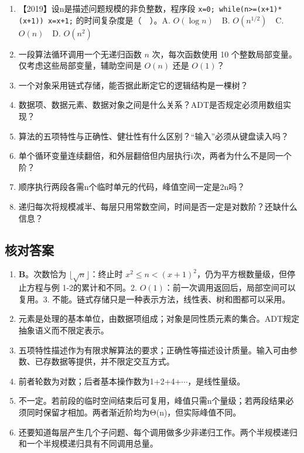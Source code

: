 \begin{recallcard}

\begin{enumerate}
\def\labelenumi{\arabic{enumi}.}
\tightlist
\item
  【2019】设n是描述问题规模的非负整数，程序段 \texttt{x=\allowbreak{}0;\allowbreak{} while(\allowbreak{}n>\allowbreak{}=\allowbreak{}(\allowbreak{}x+\allowbreak{}1)\allowbreak{}*\allowbreak{}(\allowbreak{}x+\allowbreak{}1)\allowbreak{})\allowbreak{} x=\allowbreak{}x+\allowbreak{}1;\allowbreak{}} 的时间复杂度是（　）。A. \(O(\log n)\)　B. \(O(n^{1/2})\)　C. \(O(n)\)　D. \(O(n^2)\)
\item
  一段算法循环调用一个无递归函数 \(n\) 次，每次函数使用 10 个整数局部变量。仅考虑这些局部变量，辅助空间是 \(O(n)\) 还是 \(O(1)\)？
\item
  一个对象采用链式存储，能否据此断定它的逻辑结构是一棵树？
\item
  数据项、数据元素、数据对象之间是什么关系？ADT是否规定必须用数组实现？
\item
  算法的五项特性与正确性、健壮性有什么区别？``输入''必须从键盘读入吗？
\item
  单个循环变量连续翻倍，和外层翻倍但内层执行i次，两者为什么不是同一个阶？
\item
  顺序执行两段各需n个临时单元的代码，峰值空间一定是2n吗？
\item
  递归每次将规模减半、每层只用常数空间，时间是否一定是对数阶？还缺什么信息？
\end{enumerate}

\end{recallcard}

\subsection{核对答案}\label{DS01-recall-extra}

{\begin{recallcard}

\begin{enumerate}
\def\labelenumi{\arabic{enumi}.}
\item
  \textbf{B}。次数恰为 \(\lfloor\sqrt n\rfloor\)：终止时 \(x^2\le n<(x+1)^2\)，仍为平方根数量级，但停止方程与例 1-2的累计和不同。2. \(O(1)\)：前一次调用返回后，局部空间可以复用。3. 不能。链式存储只是一种表示方法，线性表、树和图都可以采用。
\item
  元素是处理的基本单位，由数据项组成；对象是同性质元素的集合。ADT规定抽象语义而不限定表示。
\item
  五项特性描述作为有限求解算法的要求；正确性等描述设计质量。输入可由参数、已存数据等提供，并不限定交互方式。
\item
  前者轮数为对数；后者基本操作数为1+2+4+\ensuremath{\cdots}，是线性量级。
\item
  不一定。若前段的临时空间结束后可复用，峰值只需n个量级；若两段结果必须同时保留才相加。两者渐近阶均为Θ(n)，但实际峰值不同。
\item
  还要知道每层产生几个子问题、每个调用做多少非递归工作。两个半规模递归和一个半规模递归具有不同调用总量。
\end{enumerate}

\end{recallcard}}
